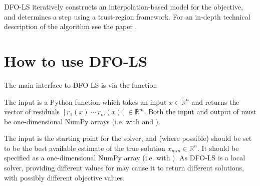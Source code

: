 \documentclass[letterpaper,10pt,english]{sphinxmanual}
\begin{document}
DFO-LS iteratively constructs an interpolation-based model for the objective, and determines a step using a trust-region framework.
For an in-depth technical description of the algorithm see the paper \label{\detokenize{userguide:id1}}{\hyperref[\detokenize{advanced:cfmr2018}]{\sphinxcrossref{{[}CFMR2018{]}}}}.


\section{How to use DFO-LS}
\label{\detokenize{userguide:how-to-use-dfo-ls}}
The main interface to DFO-LS is via the function 
\begin{quote}

\begin{sphinxVerbatim}[commandchars=\\\{\}]
   
\end{sphinxVerbatim}
\end{quote}

The input  is a Python function which takes an input \(x\in\mathbb{R}^n\) and returns the vector of residuals \([r_1(x)\: \cdots \: r_m(x)]\in\mathbb{R}^m\). Both the input and output of  must be one-dimensional NumPy arrays (i.e. with  and ).

The input  is the starting point for the solver, and (where possible) should be set to be the best available estimate of the true solution \(x_{min}\in\mathbb{R}^n\). It should be specified as a one-dimensional NumPy array (i.e. with ).
As DFO-LS is a local solver, providing different values for  may cause it to return different solutions, with possibly different objective values.
\end{document}
